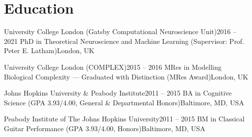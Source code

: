 
\section{Education}
\resumeSubHeadingListStart

  \resumeSubheading
    {University College London (Gatsby Computational Neuroscience Unit)}{2016 -- 2021}
    {PhD in Theoretical Neuroscience and Machine Learning (Supervisor: Prof. Peter E. Latham)}{London, UK}
    \resumeItemListStart
    \resumeItemListEnd

  \resumeSubheading
    {University College London (COMPLEX)}{2015 -- 2016}
    {MRes in Modelling Biological Complexity — Graduated with Distinction (MRes Award)}{London, UK}
    \resumeItemListStart
    \resumeItemListEnd

  \resumeSubheading
    {Johns Hopkins University \& Peabody Institute}{2011 -- 2015}
    {BA in Cognitive Science (GPA 3.93/4.00, General \& Departmental Honors)}{Baltimore, MD, USA}
    \resumeItemListStart
    \resumeItemListEnd

  \resumeSubheading
    {Peabody Institute of The Johns Hopkins University}{2011 -- 2015}
    {BM in Classical Guitar Performance (GPA 3.93/4.00, Honors)}{Baltimore, MD, USA}
    \resumeItemListStart
    \resumeItemListEnd

\resumeSubHeadingListEnd